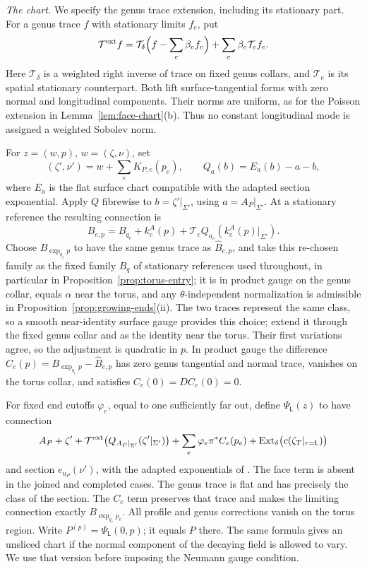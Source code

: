 \documentclass[11pt]{amsart}
\theoremstyle{definition}
\theoremstyle{remark}
\theoremstyle{plain}
\numberwithin{equation}{section}
\begin{document}
\emph{The chart.}
We specify the genus trace extension, including its stationary
part. For a genus trace $f$ with stationary limits $f_e$, put
\[
 \mathcal T^{\rm ext}f=
 \mathcal T_\delta\Bigl(f-\sum_e\beta_e f_e\Bigr)
                  +\sum_e\beta_e\mathcal T_e f_e.
\]
Here $\mathcal T_\delta$ is a weighted right inverse of trace on
fixed genus collars, and $\mathcal T_e$ is its spatial stationary
counterpart. Both lift surface-tangential forms with zero normal
and longitudinal components. Their norms are uniform, as for the
Poisson extension in Lemma~\ref{lem:face-chart}(b). Thus no
constant longitudinal mode is assigned a weighted Sobolev norm.

For $z=(w,p)$, $w=(\zeta,\nu)$, set
\[
 (\zeta',\nu')=w+\sum_e K_{P,e}(p_e),\qquad
 Q_a(b)=E_a(b)-a-b,
\]
where $E_a$ is the flat surface chart compatible with the adapted
section exponential. Apply $Q$ fibrewise to
$b=\zeta'|_{\Sigma'}$, using $a=A_P|_{\Sigma'}$. At a stationary
reference the resulting connection is
\[
 \widehat B_{e,p}=B_{q_e}+k_e^A(p)
             +\mathcal T_e Q_{a_e}(k_e^A(p)|_{\Sigma'}).
\]
Choose $B_{\exp_{q_e}p}$ to have the same genus trace as
$\widehat B_{e,p}$, and take this re-chosen family as the fixed family $B_q$ of
stationary references used throughout, in particular in
Proposition~\ref{prop:torus-entry}; it is in product gauge on the genus collar, equals
$\alpha$ near the torus, and any $\theta$-independent normalization is admissible in
Proposition~\ref{prop:growing-ends}(ii). The two traces represent the same class, so
a smooth near-identity surface gauge provides this choice; extend
it through the fixed genus collar and as the identity near the
torus. Their first variations agree, so the adjustment is quadratic
in $p$. In product gauge the difference
$C_e(p)=B_{\exp_{q_e}p}-\widehat B_{e,p}$ has zero genus
tangential and normal trace, vanishes on the torus collar, and
satisfies $C_e(0)=DC_e(0)=0$.

For fixed end cutoffs $\varphi_e$, equal to one sufficiently far
out, define $\Psi_\mathsf L(z)$ to have connection
\[
 A_P+\zeta'
 +\mathcal T^{\rm ext}\bigl(Q_{A_P|_{\Sigma'}}
                                      (\zeta'|_{\Sigma'})\bigr)
 +\sum_e\varphi_e\pi^*C_e(p_e)
 +\operatorname{Ext}_\delta
                    \bigl(c(\zeta_T|_{r=\mathsf L})\bigr)
\]
and section $e_{u_P}(\nu')$, with the adapted exponentials of
\cite[Lemma~4.4]{DFL}. The face term is absent in the joined and
completed cases. The genus trace is flat and has precisely the
class of the section. The $C_e$ term preserves that trace and
makes the limiting connection exactly $B_{\exp_{q_e}p_e}$.
All profile and genus corrections vanish on the torus region.
Write $P^{(p)}=\Psi_\mathsf L(0,p)$; it equals $P$ there.
The same formula gives an unsliced chart if the normal component
of the decaying field is allowed to vary. We use that version
before imposing the Neumann gauge condition.
\end{document}
